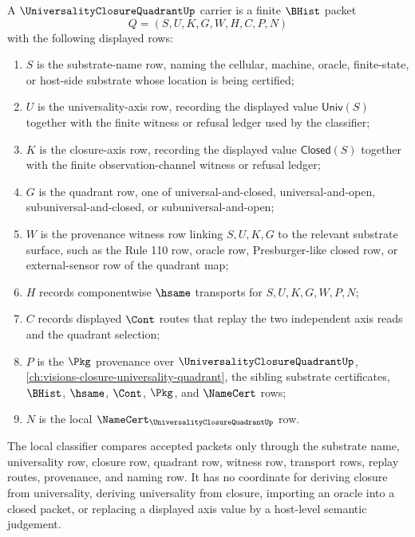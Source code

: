 \begin{definition}
\label{def:universality-closure-quadrant-carrier}
A $\UniversalityClosureQuadrantUp$ carrier is a finite $\BHist$ packet
$$
Q=(S,U,K,G,W,H,C,P,N)
$$
with the following displayed rows:
\begin{enumerate}
\item $S$ is the substrate-name row, naming the cellular, machine, oracle, finite-state, or host-side substrate whose location is being certified;
\item $U$ is the universality-axis row, recording the displayed value $\mathsf{Univ}(S)$ together with the finite witness or refusal ledger used by the classifier;
\item $K$ is the closure-axis row, recording the displayed value $\mathsf{Closed}(S)$ together with the finite observation-channel witness or refusal ledger;
\item $G$ is the quadrant row, one of universal-and-closed, universal-and-open, subuniversal-and-closed, or subuniversal-and-open;
\item $W$ is the provenance witness row linking $S,U,K,G$ to the relevant substrate surface, such as the Rule 110 row, oracle row, Presburger-like closed row, or external-sensor row of the quadrant map;
\item $H$ records componentwise $\hsame$ transports for $S,U,K,G,W,P,N$;
\item $C$ records displayed $\Cont$ routes that replay the two independent axis reads and the quadrant selection;
\item $P$ is the $\Pkg$ provenance over $\UniversalityClosureQuadrantUp$, \autoref{ch:visions-closure-universality-quadrant}, the sibling substrate certificates, $\BHist$, $\hsame$, $\Cont$, $\Pkg$, and $\NameCert$ rows;
\item $N$ is the local $\NameCert_{\UniversalityClosureQuadrantUp}$ row.
\end{enumerate}
The local classifier compares accepted packets only through the substrate name, universality row, closure row, quadrant row, witness row, transport rows, replay routes, provenance, and naming row. It has no coordinate for deriving closure from universality, deriving universality from closure, importing an oracle into a closed packet, or replacing a displayed axis value by a host-level semantic judgement.
\end{definition}

